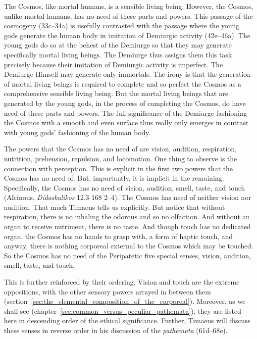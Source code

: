 The Cosmos, like mortal humans, is a sensible living being. However, the Cosmos, unlike mortal humans, has no need of these parts and powers. This passage of the cosmogeny (33c--34a) is usefully contrasted with the passage where the young gods generate the human body in imitation of Demiurgic activity (42e--46a). The young gods do so at the behest of the Demiurge so that they may generate specifically mortal living beings. The Demiurge thus assigns them this task precisely because their imitation of Demiurgic activity is imperfect. The Demiurge Himself may generate only immortals. The irony is that the generation of mortal living beings is required to complete and so perfect the Cosmos as a comprehensive sensible living being. But the mortal living beings that are generated by the young gods, in the process of completing the Cosmos, do have need of these parts and powers. The full significance of the Demiurge fashioning the Cosmos with a smooth and even surface thus really only emerges in contrast with young gods' fashioning of the human body. 

The powers that the Cosmos has no need of are vision, audition, respiration, nutrition, prehension, repulsion, and locomotion. One thing to observe is the connection with perception. This is explicit in the first two powers that the Cosmos has no need of. But, importantly, it is implicit in the remaining. Specifically, the Cosmos has no need of vision, audition, smell, taste, and touch (Alcinous, \emph{Didaskalikos} 12.3 168 2--4). The Cosmos has need of neither vision nor audition. That much Timaeus tells us explicitly. But notice that without respiration, there is no inhaling the odorous and so no olfaction. And without an organ to receive nutriment, there is no taste. And though touch has no dedicated organ, the Cosmos has no hands to grasp with, a form of haptic touch, and anyway, there is nothing corporeal external to the Cosmos which may be touched. So the Cosmos has no need of the Peripatetic five special senses, vision, audition, smell, taste, and touch. 

This is further reinforced by their ordering. Vision and touch are the extreme oppositions, with the other sensory powers arrayed in between them (section~\ref{sec:the_elemental_composition_of_the_corporeal}). Moreover, as we shall see (chapter~\ref{sec:common_versus_peculiar_pathemata}), they are listed here in descending order of the ethical significance. Further, Timaeus will discuss these senses in reverse order in his discussion of the \emph{pathēmata} (61d--68e). 

